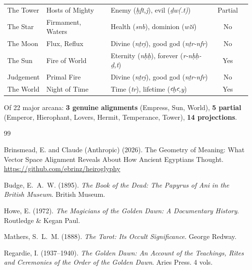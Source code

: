 \documentclass[11pt, a4paper]{article}
\begin{document}
\begin{longtable}{@{}p{1.2in}p{1.2in}p{1.2in}cp{0.5in}@{}}
The Tower & Hosts of Mighty & Enemy (\textit{ḫft,j}), evil (\textit{ḏw(.t)}) & \textcolor{match}{Partial} \\
The Star & Firmament, Waters & Health (\textit{snb}), dominion (\textit{wꜣš}) & \textcolor{mismatch}{No} \\
The Moon & Flux, Reflux & Divine (\textit{nṯri̯}), good god (\textit{nṯr-nfr}) & \textcolor{mismatch}{No} \\
The Sun & Fire of World & Eternity (\textit{nḥḥ}), forever (\textit{r-nḥḥ-ḏ,t}) & \textcolor{match}{Yes} \\
Judgement & Primal Fire & Divine (\textit{nṯri̯}), good god (\textit{nṯr-nfr}) & \textcolor{mismatch}{No} \\
The World & Night of Time & Time (\textit{tr}), lifetime (\textit{ꜥḥꜥ,y}) & \textcolor{match}{Yes} \\
\bottomrule
\end{longtable}

\noindent Of 22 major arcana: \textbf{3 genuine alignments} (Empress, Sun, World), \textbf{5 partial} (Emperor, Hierophant, Lovers, Hermit, Temperance, Tower), \textbf{14 projections}.


\begin{thebibliography}{99}

Brinsmead, E. and Claude (Anthropic) (2026).
\newblock The Geometry of Meaning: What Vector Space Alignment Reveals About How Ancient Egyptians Thought.
\newblock \url{https://github.com/ebrinz/heiroglyphy}

Budge, E.~A.~W. (1895).
\newblock \textit{The Book of the Dead: The Papyrus of Ani in the British Museum}.
\newblock British Museum.

Howe, E. (1972).
\newblock \textit{The Magicians of the Golden Dawn: A Documentary History}.
\newblock Routledge \& Kegan Paul.

Mathers, S.~L.~M. (1888).
\newblock \textit{The Tarot: Its Occult Significance}.
\newblock George Redway.

Regardie, I. (1937--1940).
\newblock \textit{The Golden Dawn: An Account of the Teachings, Rites and Ceremonies of the Order of the Golden Dawn}.
\newblock Aries Press. 4 vols.

\end{thebibliography}
\end{document}
